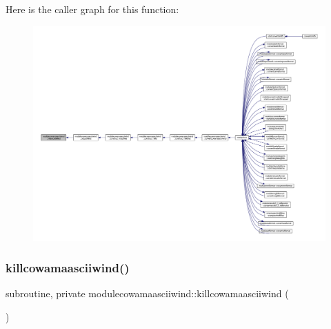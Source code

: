 Here is the caller graph for this function\+:\nopagebreak
\begin{figure}[H]
\begin{center}
\leavevmode
\includegraphics[width=350pt]{namespacemodulecowamaasciiwind_a3a43fe146a563746fe8d8ed4fb89732c_icgraph}
\end{center}
\end{figure}
\mbox{\label{namespacemodulecowamaasciiwind_a23a57a057fbbc4351c19799391d3736b}} 
\subsubsection{\texorpdfstring{killcowamaasciiwind()}{killcowamaasciiwind()}}
{\footnotesize\ttfamily subroutine, private modulecowamaasciiwind\+::killcowamaasciiwind (\begin{DoxyParamCaption}{ }\end{DoxyParamCaption})\hspace{0.3cm}{\ttfamily [private]}}

